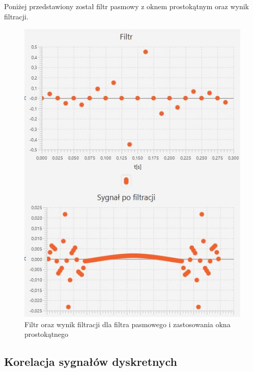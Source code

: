 \documentclass[12pt]{article}
\begin{document}
Poniżej przedstawiony został filtr pasmowy z oknem prostokątnym oraz wynik filtracji.
\begin{figure}[H]
	\centering
	\includegraphics[width=\linewidth]{filtr-pasmowy-prost}
	\caption{Filtr oraz wynik filtracji dla filtra pasmowego i zastosowania okna prostokątnego}
	\label{}
\end{figure}




\subsection{Korelacja sygnałów dyskretnych}
\end{document}
